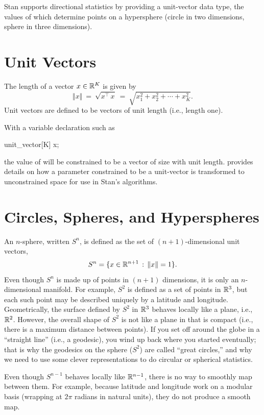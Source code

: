 Stan supports directional statistics by providing a unit-vector data
type, the values of which determine points on a hypersphere (circle in
two dimensions, sphere in three dimensions).

\section{Unit Vectors}  

The length of a vector $x \in \reals^K$ is given by
\[
\Vert x \Vert
\ = \ \sqrt{x^{\top}\,x}
\ = \ \sqrt{x_1^2 + x_2^2 + \cdots + x_K^2}.
\]
Unit vectors are defined to be vectors of unit length (i.e., length
one).

With a variable declaration such as
%
\begin{stancode}
unit_vector[K] x;
\end{stancode}
%
the value of  will be constrained to be a vector of size
 with unit length.   provides details
on how a parameter constrained to be a unit-vector is transformed to
unconstrained space for use in Stan's algorithms.

\section{Circles, Spheres, and Hyperspheres}

An $n$-sphere, written $S^{n}$, is defined as the set of $(n +
1)$-dimensional unit vectors,
\[
S^{n} = \{ x \in \reals^{n+1} \, : \, \Vert x \Vert = 1 \}.
\]
%
Even though $S^n$ is made up of points in $(n+1)$ dimensions, it is
only an $n$-dimensional manifold.  For example, $S^2$ is defined as a
set of points in $\reals^3$, but each such point may be described
uniquely by a latitude and longitude.  Geometrically, the surface
defined by $S^2$ in $\reals^3$ behaves locally like a plane, i.e.,
$\reals^2$.  However, the overall shape of $S^2$ is not like a plane
in that is compact (i.e., there is a maximum distance between points).
If you set off around the globe in a ``straight line'' (i.e., a
geodesic), you wind up back where you started eventually; that is why
the geodesics on the sphere ($S^2$) are called ``great circles,'' and
why we need to use some clever representations to do circular or
spherical statistics.

Even though $S^{n-1}$ behaves locally like $\reals^{n-1}$, there is no
way to smoothly map between them. For example, because
latitude and longitude work on a modular basis (wrapping at $2\pi$
radians in natural units), they do not produce a smooth map. 

